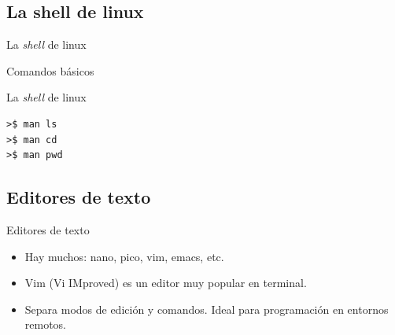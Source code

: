 \documentclass[10pt]{beamer}
\begin{document}
\subsection{La shell de linux}
\begin{frame}{La \textit{shell} de linux}
\begin{block}{Comandos básicos}
  \begin{table}
  \end{table}
\end{block}
\end{frame}

\begin{frame}[fragile]{La \textit{shell} de linux}
\begin{example}
\begin{verbatim}
>$ man ls
>$ man cd
>$ man pwd
\end{verbatim}
\end{example}
\end{frame}

\subsection{Editores de texto}
\begin{frame}{Editores de texto}
\begin{itemize}
	\item Hay muchos: nano, pico, vim, emacs, etc.
	\item Vim (Vi IMproved) es un editor muy popular en terminal.
	\item Separa modos de edición y comandos. Ideal para programación en entornos remotos.
\end{itemize}
\end{frame}
\end{document}
